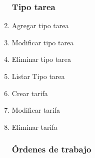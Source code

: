 \documentclass[12pt]{extarticle}
\begin{document}
\begin{spacing}{1.2}
\begin{multicols}{2}
\begin{enumerate}
        \subsubsection*{Tipo tarea}
            \item Agregar tipo tarea
            \item Modificar tipo tarea
            \item Eliminar tipo tarea
            \item Listar Tipo tarea
            \item Crear tarifa
            \item Modificar tarifa
            \item Eliminar tarifa
        \subsubsection*{Órdenes de trabajo}






\end{enumerate}
\end{multicols}
\end{spacing}
\end{document}
